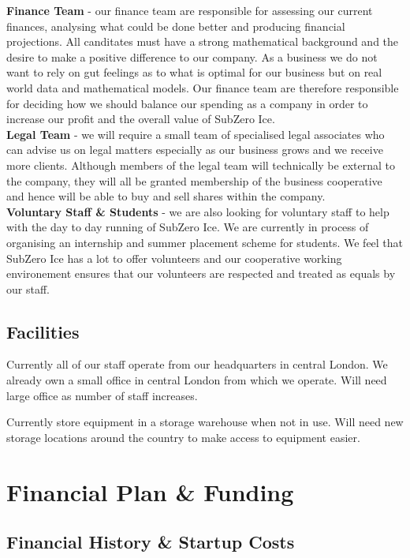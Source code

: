 \documentclass{article}
\begin{document}
  {\bf Finance Team} - our finance team are responsible for assessing our current finances, analysing what could be done better and producing financial projections. All canditates must have a strong mathematical background and the desire to make a positive difference to our company. As a business we do not want to rely on gut feelings as to what is optimal for our business but on real world data and mathematical models. Our finance team are therefore responsible for deciding how we should balance our spending as a company in order to increase our profit and the overall value of SubZero Ice. \\

  {\bf Legal Team} - we will require a small team of specialised legal associates who can advise us on legal matters especially as our business grows and we receive more clients. Although members of the legal team will technically be external to the company, they will all be granted membership of the business cooperative and hence will be able to buy and sell shares within the company. \\

  {\bf Voluntary Staff \& Students} - we are also looking for voluntary staff to help with the day to day running of SubZero Ice. We are currently in process of organising an internship and summer placement scheme for students. We feel that SubZero Ice has a lot to offer volunteers and our cooperative working environement ensures that our volunteers are respected and treated as equals by our staff.


  \subsection{Facilities}

  Currently all of our staff operate from our headquarters in central London.
  We already own a small office in central London from which we operate.
  Will need large office as number of staff increases.

  Currently store equipment in a storage warehouse when not in use.
  Will need new storage locations around the country to make access to equipment easier.


\section{Financial Plan \& Funding}

\subsection{Financial History \& Startup Costs}
\end{document}

